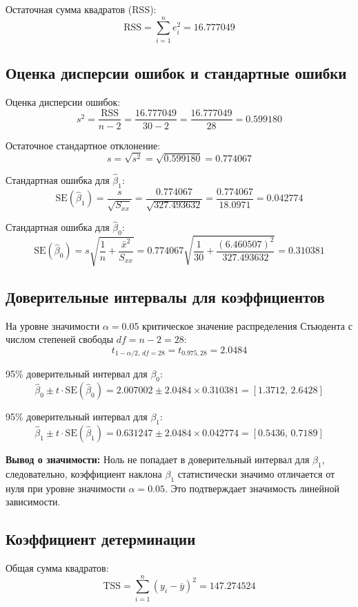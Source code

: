 \documentclass[12pt,a4paper]{article}
\begin{document}
Остаточная сумма квадратов (RSS):
\[
\text{RSS} = \sum_{i=1}^{n} e_i^2 = 16.777049
\]

\subsection{Оценка дисперсии ошибок и стандартные ошибки}

Оценка дисперсии ошибок:
\[
s^2 = \frac{\text{RSS}}{n-2} = \frac{16.777049}{30-2} = \frac{16.777049}{28} = 0.599180
\]

Остаточное стандартное отклонение:
\[
s = \sqrt{s^2} = \sqrt{0.599180} = 0.774067
\]

Стандартная ошибка для $\hat{\beta}_1$:
\[
\text{SE}(\hat{\beta}_1) = \frac{s}{\sqrt{S_{xx}}} = \frac{0.774067}{\sqrt{327.493632}} = \frac{0.774067}{18.0971} = 0.042774
\]

Стандартная ошибка для $\hat{\beta}_0$:
\[
\text{SE}(\hat{\beta}_0) = s \sqrt{\frac{1}{n} + \frac{\bar{x}^2}{S_{xx}}} = 0.774067 \sqrt{\frac{1}{30} + \frac{(6.460507)^2}{327.493632}} = 0.310381
\]

\subsection{Доверительные интервалы для коэффициентов}

На уровне значимости $\alpha = 0.05$ критическое значение распределения Стьюдента с числом степеней свободы $df = n-2 = 28$:
\[
t_{1-\alpha/2, \, df=28} = t_{0.975, 28} = 2.0484
\]

95\% доверительный интервал для $\beta_0$:
\[
\hat{\beta}_0 \pm t \cdot \text{SE}(\hat{\beta}_0) = 2.007002 \pm 2.0484 \times 0.310381 = [1.3712, \, 2.6428]
\]

95\% доверительный интервал для $\beta_1$:
\[
\hat{\beta}_1 \pm t \cdot \text{SE}(\hat{\beta}_1) = 0.631247 \pm 2.0484 \times 0.042774 = [0.5436, \, 0.7189]
\]

\textbf{Вывод о значимости:} Ноль не попадает в доверительный интервал для $\beta_1$, следовательно, коэффициент наклона $\beta_1$ статистически значимо отличается от нуля при уровне значимости $\alpha = 0.05$. Это подтверждает значимость линейной зависимости.

\subsection{Коэффициент детерминации}

Общая сумма квадратов:
\[
\text{TSS} = \sum_{i=1}^{n} (y_i - \bar{y})^2 = 147.274524
\]
\end{document}
